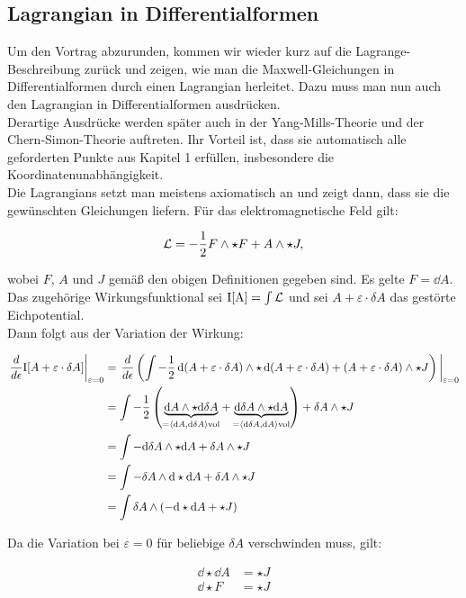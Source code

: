 \subsection{Lagrangian in Differentialformen}

Um den Vortrag abzurunden, kommen wir wieder kurz auf die Lagrange-Beschreibung zurück und zeigen, wie man die Maxwell-Gleichungen in Differentialformen durch einen Lagrangian herleitet. Dazu muss man nun auch den Lagrangian in Differentialformen ausdrücken. \\
Derartige Ausdrücke werden später auch in der Yang-Mills-Theorie und der Chern-Simon-Theorie auftreten. Ihr Vorteil ist, dass sie automatisch alle geforderten Punkte aus Kapitel 1 erfüllen, insbesondere die Koordinatenunabhängigkeit. \\

Die Lagrangians setzt man meistens axiomatisch an und zeigt dann, dass sie die gewünschten Gleichungen liefern. Für das elektromagnetische Feld gilt:

\begin{align}
\mathcal{L} = - \frac{1}{2} F \wedge \star F + A \wedge \star J,
\end{align}

wobei $F$, $A$ und $J$ gemäß den obigen Definitionen gegeben sind. Es gelte $F = \dd A$. \\

Das zugehörige Wirkungsfunktional sei $\text{I[A]}=\int \mathcal{L}$ und sei $A + \varepsilon \cdot \delta A$ das gestörte Eichpotential. \\
Dann folgt aus der Variation der Wirkung: 

\begin{align*}
\eval{\frac{d}{d \epsilon} \text{I}[A + \varepsilon \cdot \delta A]}_{\varepsilon=0} &= \eval{\frac{d}{d \epsilon} \left( \int - \frac{1}{2} \dd(A + \varepsilon \cdot \delta A) \w \star \dd(A + \varepsilon \cdot \delta A) + (A + \varepsilon \cdot \delta A) \w \star J \right)}_{\varepsilon=0} \\
&= \int - \frac{1}{2} \left(\underbrace{\dd A  \w \star \dd \delta A}_{=  \left< \dd A, \dd \delta A \right>\text{vol}}  + \underbrace{\dd \delta A \w \star \dd A}_{=  \left< \dd \delta A, \dd A \right>\text{vol}} \right) + \delta A \w \star J \\
&= \int - \dd \delta A \w \star \dd A + \delta A \w \star J  \\
&= \int - \delta A \w \dd \star \dd A + \delta A \w \star J \\
&= \int \delta A \w \left( - \dd \star \dd A + \star J \right)
\end{align*}

Da die Variation bei $\varepsilon = 0$ für beliebige $\delta A$ verschwinden muss, gilt: 

\begin{align}
\dd \star \dd A &= \star J \\
\dd \star F &= \star J
\end{align}
